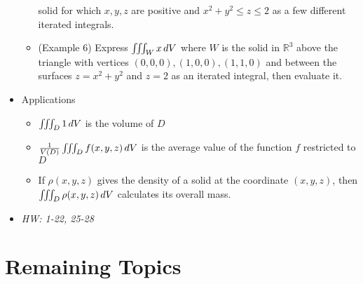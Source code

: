 \documentclass[11pt]{article}
\begin{document}
\begin{itemize}
\begin{itemize}
      solid for which \(x,y,z\) are positive and \(x^2+y^2\leq z\leq 2\)
      as a few different iterated integrals.
      \item (Example 6) Express \(\iiint_W x\,d V\) where \(W\) is the
      solid in \(\mathbb R^3\) above the triangle with vertices
      \((0,0,0),(1,0,0),(1,1,0)\) and between the surfaces \(z=x^2+y^2\)
      and \(z=2\) as an iterated integral, then evaluate it.
    \end{itemize}
  \item Applications
    \begin{itemize}
      \item \(\iiint_D 1\,d V\) is the volume of \(D\)
      \item \(\frac{1}{V(D)}\iiint_D f(x,y,z)\,d V\) is the average value
            of the function \(f\) restricted to \(D\)
      \item If \(\rho(x,y,z)\) gives the density of a solid at the coordinate
            \((x,y,z)\), then \(\iiint_D \rho(x,y,z)\,d V\) calculates its
            overall mass.
    \end{itemize}
  \item\textit{
    HW: 1-22, 25-28
  }
\end{itemize}



\section*{Remaining Topics}
\end{document}
